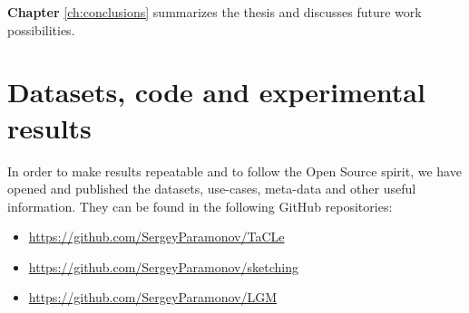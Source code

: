 \textbf{Chapter} \ref{ch:conclusions} summarizes the thesis and
discusses future work possibilities.

\section{Datasets, code and experimental results}
In order to make results repeatable and to follow the Open Source
spirit, we have opened and published the datasets, use-cases,
meta-data and other useful information.
They can be found in the following GitHub repositories:
\begin{itemize}
\item \url{https://github.com/SergeyParamonov/TaCLe}
\item \url{https://github.com/SergeyParamonov/sketching}
\item \url{https://github.com/SergeyParamonov/LGM}
\end{itemize}
\cleardoublepage

